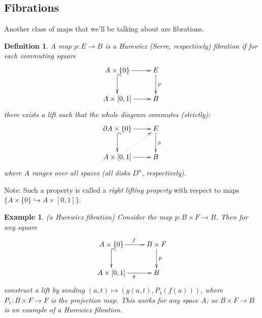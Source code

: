 \documentclass{article}
\newtheorem{definition}[theorem]{Definition}
\newtheorem{example}[theorem]{Example}
\newtheorem{proposed work}[theorem]{Proposed Work}
\newcommand{\xymat}[1]{\begin{align*}\xymatrix{ #1}\end{align*}}
\begin{document}
\subsection{Fibrations}
Another class of maps that we'll be talking about are fibrations.
\begin{definition}
A map $p:E\to B$ is a Hurewicz (Serre, respectively) fibration if for each commuting square
\xymat{A\times \lbrace 0\rbrace \ar[r] \ar@{^{(}->}[d] & E \ar[d]^p \\ A\times [0,1] \ar[r] & B} 
there exists a lift such that the whole diagram commutes (strictly):
\xymat{\partial A\times \lbrace 0\rbrace \ar[r] \ar@{^{(}->}[d] & E \ar[d]^p \\ A\times [0,1] \ar[r]\ar@{.>}[ur] & B}
where $A$ ranges over all spaces (all disks $D^n$, respectively).
\end{definition}
Note: Such a property is called a \textit{right lifting property} with respect to maps $\lbrace A\times \lbrace 0\rbrace\hookrightarrow A\times [0,1]\rbrace$.

\begin{example}(a Hurewicz fibration) Consider the map $p: B\times F\to B$. Then for any square
\xymat{A\times \lbrace 0\rbrace \ar[r]^f \ar@{^{(}->}[d] & B\times F \ar[d]^p \\ A\times [0,1] \ar[r]_g & B}
construct a lift by sending $(a,t)\mapsto (g(a,t), P_1(f(a)))$, where $P_1: B\times F\to F$ is the projection map. This works for any space $A$; so $B\times F\to B$ is an example of a Hurewicz fibration. 
\end{example}
\end{document}
